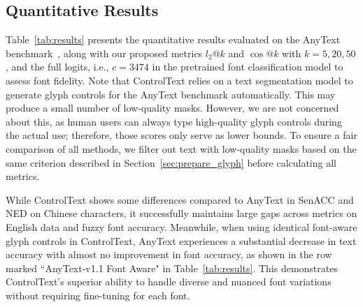 \subsection{Quantitative Results}
Table~\ref{tab:results} presents the quantitative results evaluated on the AnyText benchmark~\cite{tuo2023anytext}, along with our proposed metrics $l_2@k$ and $\cos@k$ with $k = 5, 20, 50$, and the full logits, i.e., $c = 3474$ in the pretrained font classification model to assess font fidelity. Note that ControlText relies on a text segmentation model to generate glyph controls for the AnyText benchmark automatically. This may produce a small number of low-quality masks. However, we are not concerned about this, as human users can always type high-quality glyph controls during the actual use; therefore, those scores only serve as lower bounds. To ensure a fair comparison of all methods, we filter out text with low-quality masks based on the same criterion described in Section~\ref{sec:prepare_glyph} before calculating all metrics.

While ControlText shows some differences compared to AnyText in  SenACC and NED on Chinese characters, it successfully maintains large gaps across metrics on English data and fuzzy font accuracy. Meanwhile, when using identical font-aware glyph controls in ControlText, AnyText experiences a substantial decrease in text accuracy with almost no improvement in font accuracy, as shown in the row marked ``AnyText-v1.1 Font Aware" in Table~\ref{tab:results}. This demonstrates ControlText’s superior ability to handle diverse and nuanced font variations without requiring fine-tuning for each font. 
